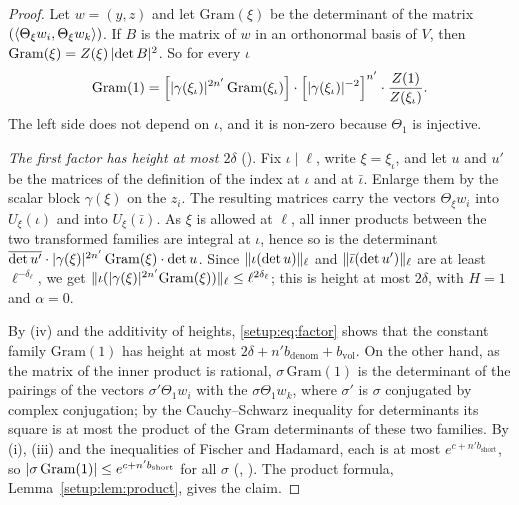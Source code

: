 \begin{proof}
Let $w = (y, z)$ and let $\mathrm{Gram}(\xi)$ be the determinant of the matrix
$(\langle\Theta_\xi w_i, \Theta_\xi w_k\rangle)$. If $B$ is the matrix of $w$ in an orthonormal basis of
$V$, then $\mathrm{Gram}(\xi) = Z(\xi)\,\lvert\det B\rvert^2$. So for every $\iota$
\begin{equation}\label{setup:eq:factor}
  \mathrm{Gram}(1) = \Bigl[ \lvert\gamma(\xi_\iota)\rvert^{2n'}\, \mathrm{Gram}(\xi_\iota) \Bigr]
     \cdot \Bigl[ \lvert\gamma(\xi_\iota)\rvert^{-2} \Bigr]^{n'} \cdot \frac{Z(1)}{Z(\xi_\iota)} .
\end{equation}
The left side does not depend on $\iota$, and it is non-zero because $\Theta_1$ is injective.

\emph{The first factor has height at most $2\delta$}
(). Fix $\iota \mid \ell$, write
$\xi = \xi_\iota$, and let $u$ and $u'$ be the matrices of the definition of the index at $\iota$
and at $\bar\iota$. Enlarge them by the scalar block $\gamma(\xi)$ on the $z_i$. The resulting
matrices carry the vectors $\Theta_\xi w_i$ into $U_\xi(\iota)$ and into $U_\xi(\bar\iota)$. As
$\xi$ is allowed at $\ell$, all inner products between the two transformed families are integral
at $\iota$, hence so is the determinant
$\overline{\det u'}\cdot\lvert\gamma(\xi)\rvert^{2n'}\,\mathrm{Gram}(\xi)\cdot\det u$. Since
$\lVert\iota(\det u)\rVert_\ell$ and $\lVert\bar\iota(\det u')\rVert_\ell$ are at least $\ell^{-\delta_\ell}$, we get
$\lVert\iota(\lvert\gamma(\xi)\rvert^{2n'}\mathrm{Gram}(\xi))\rVert_\ell \le \ell^{2\delta_\ell}$; this is
height at most $2\delta$, with $H = 1$ and $\alpha = 0$.

By (iv) and the additivity of heights, \eqref{setup:eq:factor} shows that the constant family
$\mathrm{Gram}(1)$ has height at most $2\delta + n' b_{\mathrm{denom}} + b_{\mathrm{vol}}$. On the
other hand, as the matrix of the inner product is rational, $\sigma\,\mathrm{Gram}(1)$ is the
determinant of the pairings of the vectors $\sigma'\Theta_1 w_i$ with the $\sigma\Theta_1 w_k$, where
$\sigma'$ is $\sigma$ conjugated by complex conjugation; by the Cauchy--Schwarz inequality for determinants its
square is at most the product of the Gram determinants of these two families. By (i), (iii) and
the inequalities of Fischer and Hadamard, each is at most $e^{c + n' b_{\mathrm{short}}}$, so
$\lvert\sigma\,\mathrm{Gram}(1)\rvert \le e^{c + n' b_{\mathrm{short}}}$ for all $\sigma$
(,
). The product formula,
Lemma~\ref{setup:lem:product}, gives the claim.
\end{proof}

